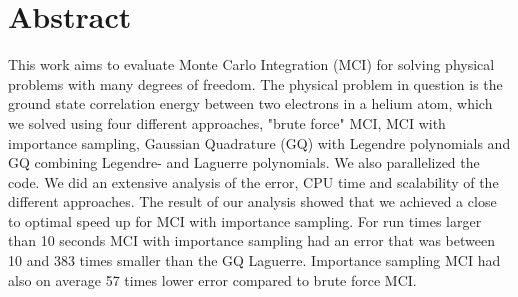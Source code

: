 \section*{Abstract}
This work aims to evaluate Monte Carlo Integration (MCI) for solving physical
problems with many degrees of freedom. The physical problem in question is
the ground state correlation energy between two electrons in a helium atom,
which we solved using four different approaches, "brute force" MCI, MCI with
importance sampling, Gaussian Quadrature (GQ) with Legendre polynomials and GQ
combining Legendre- and Laguerre polynomials. We also parallelized the code.
We did an extensive analysis of the error,
CPU time and scalability of the different approaches. The result of our
analysis showed that we achieved a close to optimal speed up for MCI with
importance sampling. For run times larger than 10 seconds MCI with importance
sampling had an error that was between 10 and 383 times smaller than the
GQ Laguerre. Importance sampling MCI had also on average 57 times lower error
compared to brute force MCI. 
